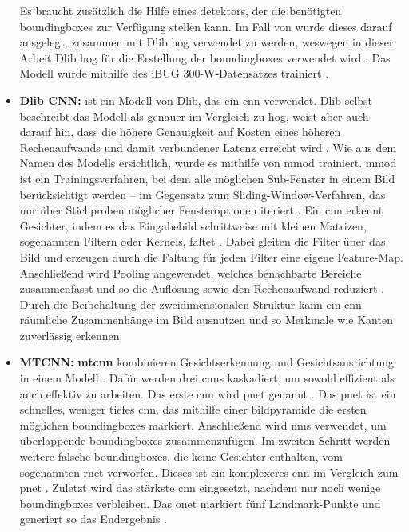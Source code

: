 \begin{itemize}
Es braucht zusätzlich die Hilfe eines \gls{detektor}s, der die benötigten \gls{boundingbox}es zur Verfügung stellen kann. Im Fall von  wurde dieses darauf ausgelegt, zusammen mit Dlib \gls{hog} verwendet zu werden, weswegen in dieser Arbeit Dlib \gls{hog} für die Erstellung der \gls{boundingbox}es verwendet wird \parencite{King24}. Das Modell wurde mithilfe des iBUG 300-W-Datensatzes trainiert \parencite{King24, faceLandmarkDetectionoD}.
%
	\item \textbf{Dlib CNN:}  ist ein Modell von Dlib, das ein \gls{cnn} verwendet. Dlib selbst beschreibt das Modell als genauer im Vergleich zu \gls{hog}, weist aber auch darauf hin, dass die höhere Genauigkeit auf Kosten eines höheren Rechenaufwands und damit verbundener Latenz erreicht wird \parencite{cnnFaceDetectoroD}. Wie aus dem Namen des Modells ersichtlich, wurde es mithilfe von \gls{mmod} trainiert. \gls{mmod} ist ein Trainingsverfahren, bei dem alle möglichen Sub-Fenster in einem Bild berücksichtigt werden – im Gegensatz zum Sliding-Window-Verfahren, das nur über Stichproben möglicher Fensteroptionen iteriert \parencite{King15}. Ein \gls{cnn} erkennt Gesichter, indem es das Eingabebild schrittweise mit kleinen Matrizen, sogenannten Filtern oder Kernels, faltet \parencite{OSheaN15}. Dabei gleiten die Filter über das Bild und erzeugen durch die Faltung für jeden Filter eine eigene Feature-Map. Anschließend wird Pooling angewendet, welches benachbarte Bereiche zusammenfasst und so die Auflösung sowie den Rechenaufwand reduziert \parencite{OSheaN15, GeeksforGeeks25}. Durch die Beibehaltung der zweidimensionalen Struktur kann ein \gls{cnn} räumliche Zusammenhänge im Bild ausnutzen und so Merkmale wie Kanten zuverlässig erkennen.
%	
	\item \textbf{MTCNN:} \textbf{\gls{mtcnn}} kombinieren Gesichtserkennung und Gesichtsausrichtung in einem Modell \parencite{ZhangZL016}. Dafür werden drei \gls{cnn}s kaskadiert, um sowohl effizient als auch effektiv zu arbeiten. Das erste \gls{cnn} wird \gls{pnet} genannt \parencite{ZhangZL016}. Das \gls{pnet} ist ein schnelles, weniger tiefes \gls{cnn}, das mithilfe einer \gls{bildpyramide} die ersten möglichen \gls{boundingbox}es markiert. Anschließend wird \gls{nms} verwendet, um überlappende \gls{boundingbox}es zusammenzufügen. Im zweiten Schritt werden weitere falsche \gls{boundingbox}es, die keine Gesichter enthalten, vom sogenannten \gls{rnet} verworfen. Dieses ist ein komplexeres \gls{cnn} im Vergleich zum \gls{pnet} \parencite{ZhangZL016}. Zuletzt wird das stärkste \gls{cnn} eingesetzt, nachdem nur noch wenige \gls{boundingbox}es verbleiben. Das \gls{onet} markiert fünf Landmark-Punkte und generiert so das Endergebnis \parencite{ZhangZL016}.

\end{itemize}
